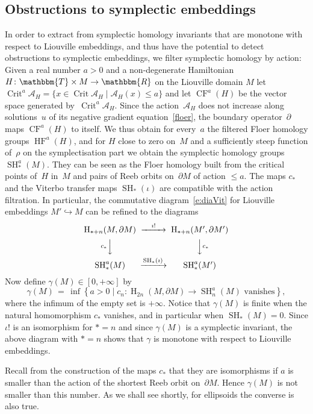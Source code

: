 \documentclass[12pt,twoside]{amsart}
\theoremstyle{plain}
\numberwithin{figure}{section}
\numberwithin{equation}{section}
\def\Crit{\operatorname{Crit}}
\def\H{\operatorname{H}}
\def\CF{\operatorname{CF}}
\def\HF{\operatorname{HF}}
\def\SH{\operatorname{SH}}
\def\gg{\gamma}
\def\ca{{\mathcal A}}
\def\RR{\mathbbm{R}}
\def\TT{\mathbbm{T}}
\def\pp{\partial}
\begin{document}
\subsection{Obstructions to symplectic embeddings} \label{s:emb}
%
In order to extract from symplectic homology invariants that are monotone 
with respect to Liouville embeddings, and thus have the potential to detect 
obstructions to symplectic embeddings, 
we filter symplectic homology by action:
%
Given a real number $a>0$ and a non-degenerate Hamiltonian $H \colon \TT \times M \to \RR$
on the Liouville domain $M$ let $\Crit^a \ca_H = \{ x \in \Crit \ca_H \mid \ca_H(x) \leqslant a \}$
and let $\CF^a (H)$ be the vector space generated by~$\Crit^a \ca_H$.
Since the action~$\ca_H$ does not increase along solutions~$u$ of its 
negative gradient equation~\eqref{floer}, 
the boundary operator~$\pp$ maps $\CF^a (H)$ to itself.
We thus obtain for every~$a$ the filtered Floer homology groups $\HF^a (H)$,
and for $H$ close to zero on~$M$ and a sufficiently steep function of~$\rho$ on the
symplectisation part we obtain the symplectic homology groups~$\SH_*^a(M)$.
They can be seen as the Floer homology built from the critical points of~$H$ in~$M$ and pairs of
Reeb orbits on~$\pp M$ of action $\leqslant a$.
The maps $c_*$ and the Viterbo transfer maps $\SH_*(\iota)$ are compatible with
the action filtration. In particular, the commutative diagram~\eqref{e:diaVit}
for Liouville embeddings $M' \hookrightarrow M$
can be refined to the diagrams
\[
\begin{CD}
\H_{*+n}(M,\partial M) @>{\imath !}>> \H_{*+n}(M',\partial M') \\ @V{c_*}VV @VV{c_*}V \\ 
\SH_*^a(M) @>{\SH_*(\imath)\,}>> \SH_*^a(M') 
\end{CD}
\]
Now define $\gg (M) \in [0,+\infty]$ by 
\begin{equation} \label{def:gg}
\gg (M) \,=\, \inf 
\left\{ a>0 \mid c_n \colon \H_{2n} (M,\pp M) \to \SH_n^a (M) \mbox{ vanishes} \right\} ,
\end{equation}
where the infimum of the empty set is $+\infty$. Notice that $\gamma(M)$ is finite when the natural homomorphism $c_*$ vanishes, and in particular when $\SH_*(M)=0$.
Since $\iota!$ is an isomorphism for $*=n$ and since $\gg (M)$ is a symplectic invariant,
the above diagram with $*=n$ shows that $\gg$ is monotone with respect to Liouville embeddings.

Recall from the construction of the maps $c_*$ that they are isomorphisms
if $a$ is smaller than the action of the shortest Reeb orbit on~$\pp M$.
Hence $\gg (M)$ is not smaller than this number.
As we shall see shortly,  
for ellipsoids the converse is also true.
\end{document}

